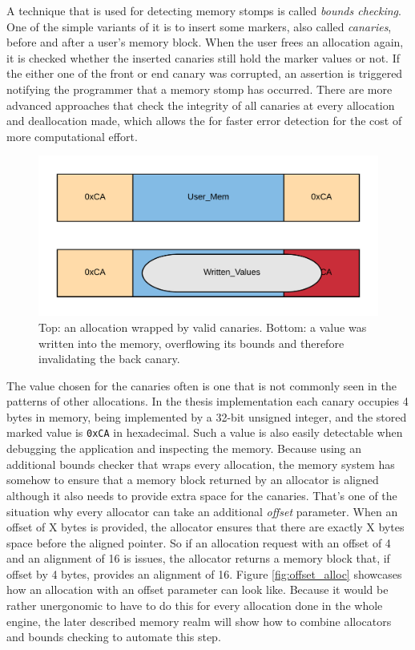 A technique that is used for detecting memory stomps is called \textit{bounds checking}. One of the simple variants of it is to insert some markers, also called \textit{canaries}, before and after a user's memory block. When the user frees an allocation again, it is checked whether the inserted canaries still hold the marker values or not. If the either one of the front or end canary was corrupted, an assertion is triggered notifying the programmer that a memory stomp has occurred. There are more advanced approaches that check the integrity of all canaries at every allocation and deallocation made, which allows the for faster error detection for the cost of more computational effort. 

\begin{figure}[h!]
	\centering \includegraphics[width=\linewidth]{PICs/canaries.png}
	\caption{Top: an allocation wrapped by valid canaries. Bottom: a value was written into the memory, overflowing its bounds and therefore invalidating the back canary.}
	\label{fig:canaries}
\end{figure}

\noindent
The value chosen for the canaries often is one that is not commonly seen in the patterns of other allocations. In the thesis implementation each canary occupies 4 bytes in memory, being implemented by a 32-bit unsigned integer, and the stored marked value is \texttt{0xCA} in hexadecimal. Such a value is also easily detectable when debugging the application and inspecting the memory. Because using an additional bounds checker that wraps every allocation, the memory system has somehow to ensure that a memory block returned by an allocator is aligned although it also needs to provide extra space for the canaries. That's one of the situation why every allocator can take an additional \textit{offset} parameter. When an offset of X bytes is provided, the allocator ensures that there are exactly X bytes space before the aligned pointer. So if an allocation request with an offset of 4 and an alignment of 16 is issues, the allocator returns a memory block that, if offset by 4 bytes, provides an alignment of 16. Figure \ref{fig:offset_alloc} showcases how an allocation with an offset parameter can look like. Because it would be rather unergonomic to have to do this for every allocation done in the whole engine, the later described memory realm will show how to combine allocators and bounds checking to automate this step.

